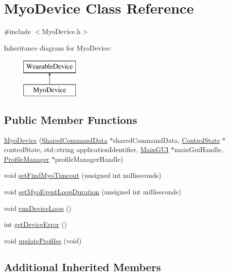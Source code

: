 \hypertarget{class_myo_device}{\section{Myo\+Device Class Reference}
\label{class_myo_device}
}


{\ttfamily \#include $<$Myo\+Device.\+h$>$}

Inheritance diagram for Myo\+Device\+:\begin{figure}[H]
\begin{center}
\leavevmode
\includegraphics[height=2.000000cm]{class_myo_device}
\end{center}
\end{figure}
\subsection*{Public Member Functions}
\begin{DoxyCompactItemize}
\item 
\hyperlink{class_myo_device_aa6d9def395a5d1704f1734d944a1ab98}{Myo\+Device} (\hyperlink{class_shared_command_data}{Shared\+Command\+Data} $\ast$shared\+Command\+Data, \hyperlink{class_control_state}{Control\+State} $\ast$control\+State, std\+::string application\+Identifier, \hyperlink{class_main_g_u_i}{Main\+G\+U\+I} $\ast$main\+Gui\+Handle, \hyperlink{class_profile_manager}{Profile\+Manager} $\ast$profile\+Manager\+Handle)
\item 
void \hyperlink{class_myo_device_af446081b034056edff7d7132102f1a8c}{set\+Find\+Myo\+Timeout} (unsigned int milliseconds)
\item 
void \hyperlink{class_myo_device_a395ebe609f5ccc11e85a5aa3002dddb7}{set\+Myo\+Event\+Loop\+Duration} (unsigned int milliseconds)
\item 
void \hyperlink{class_myo_device_a263e12e527f3984e8e2946f52d4fa111}{run\+Device\+Loop} ()
\item 
int \hyperlink{class_myo_device_a14db6f7115e407711091beed9b9992a6}{get\+Device\+Error} ()
\item 
void \hyperlink{class_myo_device_a79f6967817e023bca1843028ad3a0329}{update\+Profiles} (void)
\end{DoxyCompactItemize}
\subsection*{Additional Inherited Members}


